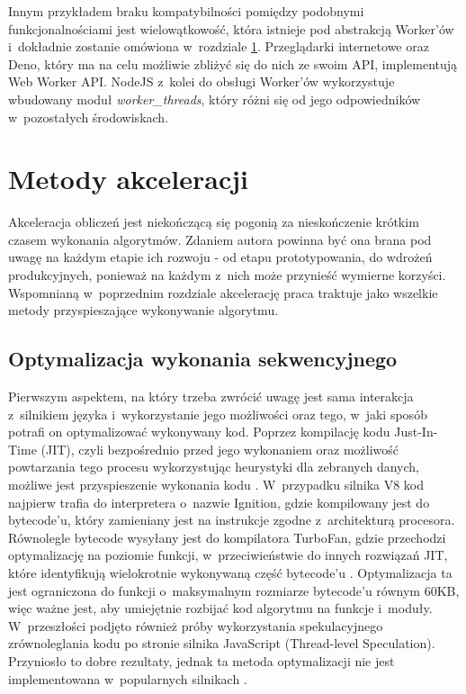 Innym przykładem braku kompatybilności pomiędzy podobnymi funkcjonalnościami jest wielowątkowość, która istnieje pod abstrakcją Worker'ów i~dokładnie zostanie omówiona w~rozdziale \ref{sec:acc-methods}. Przeglądarki internetowe oraz Deno, który ma na celu możliwie zbliżyć się do nich ze swoim API, implementują Web Worker API. NodeJS z~kolei do obsługi Worker'ów wykorzystuje wbudowany moduł \textit{worker\_threads}, który różni się od jego odpowiedników w~pozostałych środowiskach.    

\section{Metody akceleracji}
\label{sec:acc-methods}

Akceleracja obliczeń jest niekończącą się pogonią za nieskończenie krótkim czasem wykonania algorytmów. Zdaniem autora powinna być ona brana pod uwagę na każdym etapie ich rozwoju - od etapu prototypowania, do wdrożeń produkcyjnych, ponieważ na każdym z~nich może przynieść wymierne korzyści. Wspomnianą w~poprzednim rozdziale akcelerację praca traktuje jako wszelkie metody przyspieszające wykonywanie algorytmu.

\subsection{Optymalizacja wykonania sekwencyjnego}

Pierwszym aspektem, na który trzeba zwrócić uwagę jest sama interakcja z~silnikiem języka i~wykorzystanie jego możliwości oraz tego, w~jaki sposób potrafi on optymalizować wykonywany kod. Poprzez kompilację kodu Just-In-Time (JIT), czyli bezpośrednio przed jego wykonaniem oraz możliwość powtarzania tego procesu wykorzystując heurystyki dla zebranych danych, możliwe jest przyspieszenie wykonania kodu \cite{meurer_2017}. W~przypadku silnika V8 kod najpierw trafia do interpretera o~nazwie Ignition, gdzie kompilowany jest do bytecode'u, który zamieniany jest na instrukcje zgodne z~architekturą procesora. Równolegle bytecode wysyłany jest do kompilatora TurboFan, gdzie przechodzi optymalizację na poziomie funkcji, w~przeciwieństwie do innych rozwiązań JIT, które identyfikują wielokrotnie wykonywaną część bytecode'u \cite{meurer_2019}. Optymalizacja ta jest ograniczona do funkcji o~maksymalnym rozmiarze bytecode'u równym 60KB, więc ważne jest, aby umiejętnie rozbijać kod algorytmu na funkcje i~moduły. W~przeszłości podjęto również próby wykorzystania spekulacyjnego zrównoleglania kodu po stronie silnika JavaScript (Thread-level Speculation). Przyniosło to dobre rezultaty, jednak ta metoda optymalizacji nie jest implementowana w~popularnych silnikach \cite{martinsen2017combining}.

